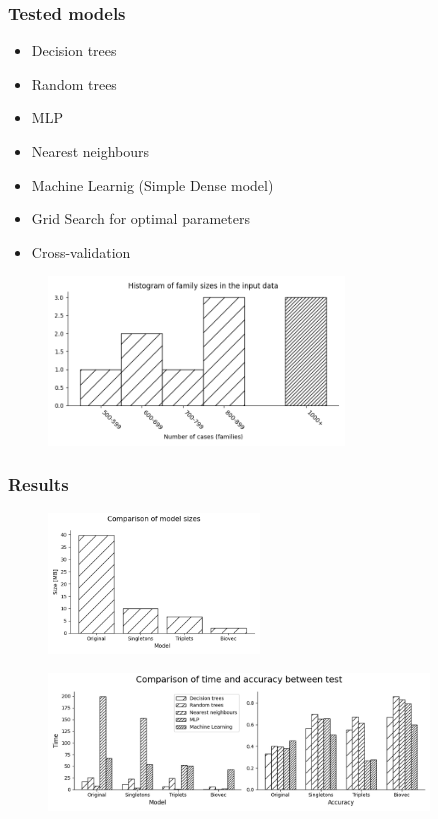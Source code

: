 \documentclass[10pt]{beamer}
\begin{document}
\begin{frame}
\frametitle{Tested models}
\begin{itemize}
\item Decision trees
\item Random trees
\item MLP
\item Nearest neighbours
\item Machine Learnig (Simple Dense model)
\end{itemize}

\begin{itemize}
\item Grid Search for optimal parameters
\item Cross-validation
\end{itemize}
\begin{figure}[H]
\begin{center}
\includegraphics[width=0.7\textwidth]{histogram}
\end{center}
\end{figure}
\end{frame}

\begin{frame}
\frametitle{Results}
\begin{figure}[H]
\begin{center}
\includegraphics[width=0.5\textwidth]{sizes}
\end{center}
\end{figure}

\begin{figure}[H]
\begin{center}
\includegraphics[width=0.9\textwidth]{benchmark}
\end{center}
\end{figure}
\end{frame}
\end{document}
